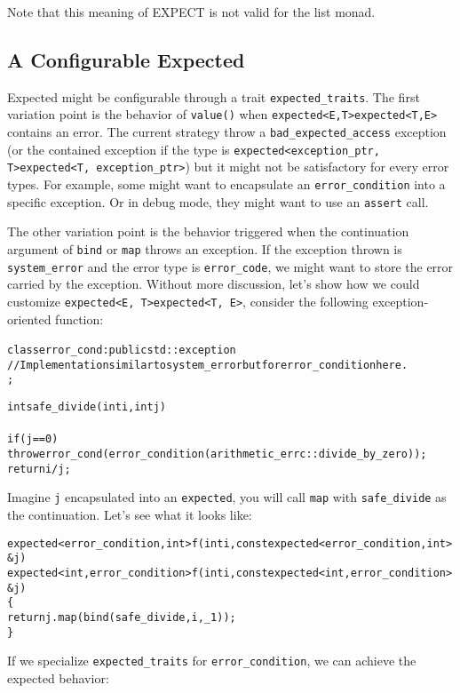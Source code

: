 \documentclass[a4paper,10pt]{article}
\newcommand{\cpp}[1]{\lstinline{#1}}
\newcommand{\suppress}[1]{\colorbox{suppress_color}{#1}}
\newcommand{\update}[1]{\colorbox{update_color}{#1}}
\begin{document}
Note that this meaning of EXPECT is not valid for the list monad. 

\subsection{A Configurable Expected}
\label{configurable-expected}

Expected might be configurable through a trait \cpp{expected_traits}. The first variation point is the behavior of \cpp{value()} when \suppress{\cpp{expected<E,T>}}\update{\cpp{expected<T,E>}} contains an error. The current strategy throw a \cpp{bad_expected_access} exception (or the contained exception if the type is \suppress{\cpp{expected<exception_ptr, T>}}\update{\cpp{expected<T, exception_ptr>}}) but it might not be satisfactory for every error types. For example, some might want to encapsulate an \cpp{error_condition} into a specific exception. Or in debug mode, they might want to use an \cpp{assert} call.

The other variation point is the behavior triggered when the continuation argument of \cpp{bind} or \cpp{map} throws an exception. If the exception thrown is \cpp{system_error} and the error type is \cpp{error_code}, we might want to store the error carried by the exception. Without more discussion, let's show how we could customize \suppress{\cpp{expected<E, T>}}\update{\cpp{expected<T, E>}}, consider the following exception-oriented function:

\begin{alltt}
class error_cond : public std::exception {
  // Implementation similar to system_error but for error_condition here.
};

int safe_divide(int i, int j)
{
  if (j == 0) 
    throw error_cond(error_condition(arithmetic_errc::divide_by_zero));
  return i/j;
}
\end{alltt}

\noindent
Imagine \cpp{j} encapsulated into an \cpp{expected}, you will call \cpp{map} with \cpp{safe_divide} as the continuation. Let's see what it looks like:

\begin{alltt}
\suppress{expected<error_condition, int> f(int i, const expected<error_condition, int>& j)}
\update{expected<int, error_condition> f(int i, const expected<int, error_condition>& j)}
\{
  return j.map(bind(safe_divide, i, _1));
\}
\end{alltt}

\noindent
If we specialize \cpp{expected_traits} for \cpp{error_condition}, we can achieve the expected behavior:
\end{document}
